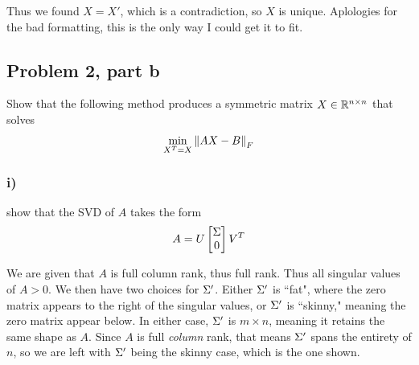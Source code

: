 \begin{solution}
{}%
    Thus we found $X = X'$, which is a contradiction, so $X$ is unique. Aplologies for the bad formatting, this is the only way I could get it to fit.
\end{solution}

\newpage
\subsection{Problem 2, part b}
Show that the following method produces a symmetric matrix $X \in \mathbb{R}^{n \times n}$ that solves 
\[
\min_{X^T = X} \norm{AX - B}_F
\]
\subsubsection{i)}
show that the SVD of $A$ takes the form
\[
A = U\begin{bmatrix}\Sigma \\ 0\end{bmatrix}V^T
\]
\partbreak
\begin{solution}

    We are given that $A$ is full column rank, thus full rank. Thus all singular values of $A > 0$. We then have two choices for $\Sigma '$. Either $\Sigma '$ is ``fat", where the zero matrix appears to the right of the singular values, or $\Sigma'$ is ``skinny," meaning the zero matrix appear below. In either case, $\Sigma'$ is $m \times n$, meaning it retains the same shape as $A$. Since $A$ is full \textit{column} rank, that means $\Sigma'$ spans the entirety of $n$, so we are left with $\Sigma'$ being the skinny case, which is the one shown.
\end{solution}
